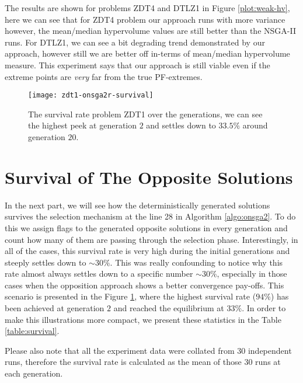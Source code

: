 \documentclass[journal]{IEEEtran}
\let\MYoriglatexcaption\caption
\renewcommand{\caption}[2][\relax]{\MYoriglatexcaption[#2]{#2}}
\begin{document}
The results are shown for problems ZDT4 and DTLZ1 in Figure \ref{plot:weak-hv}, here we can see that for ZDT4 problem our approach runs with more variance however, the mean/median hypervolume values are still better than the NSGA-II runs. For DTLZ1, we can see a bit degrading trend demonstrated by our approach, however still we are better off in-terms of mean/median hypervolume measure. This experiment says that our approach is still viable even if the extreme points are \textit{very} far from the true PF-extremes.
\begin{figure}[t]
\centering
\texttt{[image: zdt1-onsga2r-survival]}
\caption{The survival rate problem ZDT1 over the generations, we can see the highest peek at generation \(2\) and settles down to \(33.5\%\) around generation \(20\).}
\label{plot:zdt1-survival}
\end{figure}
%
\section{Survival of The Opposite Solutions}
\label{sec:survival}
In the next part, we will see how the deterministically generated solutions survives the selection mechanism at the line 28 in Algorithm \ref{algo:onsga2}. To do this we assign flags to the generated opposite solutions in every generation and count how many of them are passing through the selection phase. Interestingly, in all of the cases, this survival rate is very high during the initial generations and steeply settles down to \(\sim30\%\). This was really confounding to notice why this rate almost always settles down to a specific number \(\sim30\%\), especially in those cases when the opposition approach shows a better convergence pay-offs. This scenario is presented in the Figure \ref{plot:zdt1-survival}, where the highest survival rate (\(94\%\)) has been achieved at generation \(2\) and reached the equilibrium at \(33\%\). In order to make this illustrations more compact, we present these statistics in the Table \ref{table:survival}.

Please also note that all the experiment data were collated from \(30\) independent runs, therefore the survival rate is calculated as the mean of those \(30\) runs at each generation.\vfill \eject
\end{document}
